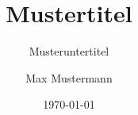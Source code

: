 \documentclass[subject=math]{avhths}
\title{Mustertitel}
\subtitle{Musteruntertitel}
\author{Max Mustermann}
\date{\today}
\begin{document}
    \maketitle
    \tableofcontents
    \blinddocument
    \appendix
    \blinddocument
    \printdeclofindep
\end{document}
